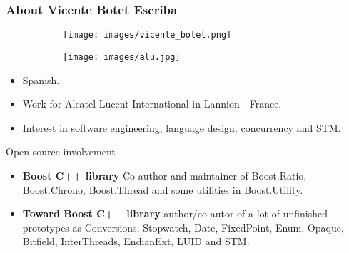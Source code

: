 \documentclass[xcolor=dvipsnames]{beamer}
\begin{document}
\begin{frame}
\frametitle{About Vicente Botet Escriba}

\begin{figure}[p]
  \centering
  \begin{subfigure}[b]{0.3\textwidth}
    \texttt{[image: images/vicente\_botet.png]}
  \end{subfigure}
  \qquad \qquad \quad
  \begin{subfigure}[b]{0.3\textwidth}
    \texttt{[image: images/alu.jpg]}
  \end{subfigure}
\end{figure}

\begin{itemize}
\item Spanish.
\item Work for Alcatel-Lucent International in Lannion - France.
\item Interest in software engineering, language design, concurrency and STM.
\end{itemize}

\begin{block}{Open-source involvement}
\begin{itemize}
\item \textbf{Boost C++ library} Co-author and maintainer of Boost.Ratio, Boost.Chrono, Boost.Thread and some utilities in Boost.Utility.
\item \textbf{Toward Boost C++ library} author/co-autor of a lot of unfinished prototypes as Conversions, Stopwatch, Date, FixedPoint, Enum, Opaque, Bitfield, InterThreads, EndianExt, LUID and STM.
\end{itemize}
\end{block}
\end{frame}
\end{document}
